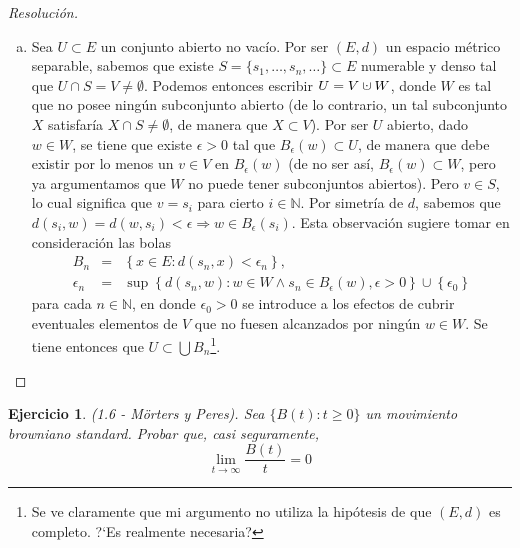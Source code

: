 \documentclass[a4paper,11pt]{article}
\newcommand{\cupdot}{\mathbin{\mathaccent\cdot\cup}}
\newcommand{\Bola}[2]{\ensuremath{B_{#2}(#1)}}
\newtheorem*{ej}{Ejercicio}
\begin{document}
\begin{proof}[Resoluci\'on]
$ $

\begin{enumerate}[a)]
    \item Sea $U \subset E$ un conjunto abierto no vacío. Por ser $(E,d)$ un
    espacio métrico separable, sabemos que existe
    $S = \{s_1,\dots,s_n,\dots\} \subset E$ numerable y denso tal que
    $U \cap S = V \neq \emptyset$. Podemos entonces escribir $U = V \cupdot W$,
    donde $W$ es tal que no posee ningún subconjunto abierto (de lo
    contrario, un tal subconjunto $X$ satisfaría $X \cap S \neq \emptyset$,
    de manera que $X \subset V$). Por ser $U$ abierto, dado $w \in W$, se tiene
    que existe $\epsilon > 0$ tal que $\Bola{w}{\epsilon} \subset U$, de manera
    que debe existir por lo menos un $v \in V$ en $\Bola{w}{\epsilon}$ (de no ser
    así, $\Bola{w}{\epsilon} \subset W$, pero ya argumentamos que $W$ no puede
    tener subconjuntos abiertos). Pero $v \in S$, lo cual significa que 
    $v = s_i$ para cierto $i \in \mathbb{N}$. Por simetría de $d$, sabemos que
    $d(s_i, w) = d(w,s_i) < \epsilon \Rightarrow w \in \Bola{s_i}{\epsilon}$.
    Esta observación sugiere tomar en consideración las bolas
    \begin{eqnarray*}
        B_n &=& \left\{ x \in E : d(s_n, x) < \epsilon_n \right\}, \\
        \epsilon_n &=& \sup \left\{ d(s_n,w) : w \in W \wedge s_n
            \in \Bola{w}{\epsilon}, \epsilon > 0 \right\}
            \cup \left\{ \epsilon_0 \right\}
    \end{eqnarray*}
    para cada $n \in \mathbb{N}$, en donde $\epsilon_0 > 0$ se introduce a los
    efectos de cubrir eventuales elementos de $V$ que no fuesen alcanzados por
    ningún $w \in W$. Se tiene entonces que
    $U \subset \bigcup{B_n}$\footnote{Se ve claramente que mi argumento no utiliza
    la hipótesis de que $(E,d)$ es completo. ?`Es realmente necesaria?}.
\end{enumerate}

\end{proof}


\begin{ej}
    (1.6 - Mörters y Peres). Sea $\{B(t) : t \geq 0\}$ un movimiento browniano
    standard. Probar que, casi seguramente,
    $$\lim_{t \to \infty}{\frac{B(t)}{t}} = 0$$ 
\end{ej}
\end{document}
